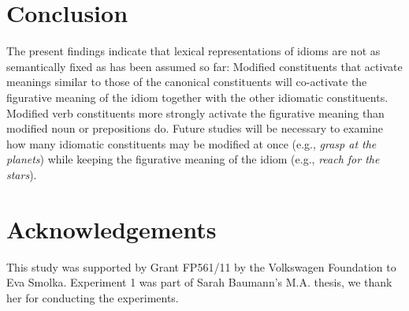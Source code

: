 \documentclass[output=paper]{langsci/langscibook}
\begin{document}
\section{Conclusion}
The present findings indicate that lexical representations of idioms are not as semantically fixed as has been assumed so far: Modified constituents that activate meanings similar to those of the canonical constituents will co-activate the figurative meaning of the idiom together with the other idiomatic constituents. Modified verb constituents more strongly activate the figurative meaning than modified noun or prepositions do. Future studies will be necessary to examine how many idiomatic constituents may be modified at once (e.g., \textit{grasp at the planets}) while keeping the figurative meaning of the idiom (e.g., \textit{reach for the stars}).

\section*{Acknowledgements}
This study was supported by Grant FP561/11 by the Volkswagen Foundation to Eva Smolka. Experiment 1 was part of Sarah Baumann's M.A. thesis, we thank her for conducting the experiments.


{\sloppy\printbibliography[heading=subbibliography]}
\end{document}
